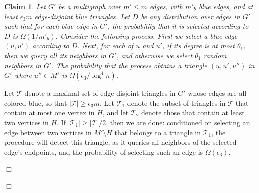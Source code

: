 \documentclass{article}
\newcommand{\eps}{\epsilon}
\newcommand{\calC}{{\mathcal{C}}}
\newcommand{\calT}{{\mathcal{T}}}
\newenvironment{proof}{\smallskip\noindent{\bf Proof:}}%
        {\hspace*{\fill}$\Box$\par}
\newtheorem{claim}[lemma]{Claim}
\newcommand{\commentt}[1]{ {}}
\begin{document}
\begin{proof}

\begin{claim}\label{clm:tri-G-prime}
Let $G'$ be a multigraph over $m' \leq m$ edges, with $m'_b$ blue edges, and 
at least $\eps_3 m$ edge-disjoint blue triangles. 
Let $D$ be any distribution over edges in $G'$ such that for each blue edge in $G'$, the probability that it is selected according to $D$ is %
$\Omega(1/m'_b)$.
Consider the following process.
First we select a blue edge $(u,u')$ according to $D$. 
Next, for each of $u$ and $u'$, if its degree %
is at most $\theta_1$, then we query all its neighbors in $G'$, and otherwise
we select $\theta_1$  random neighbors in $G'$.
 The probability that the process obtains a triangle $(u,u',u'')$ in $G'$ where $u''\in M'$ is 
$\Omega(\eps_3/\log^4 n)$.
\end{claim}

\begin{proof}
Let $\calT$ denote a maximal set of edge-disjoint triangles in $G'$ whose edges are all colored blue, so that $|\calT| \geq \eps_3 m$. Let $\calT_1$ denote the subset of triangles in $\calT$ that contain at most one vertex in $H$, and let $\calT_2$ denote those that contain at least two vertices in $H$. If $|\calT_1| \geq |\calT|/2$, then we are done:  conditioned on selecting an edge between two vertices in $M'\setminus H$ that belongs to a triangle in $\calT_1$, the procedure will detect this triangle, as it queries all neighbors of the selected edge's endpoints, and the probability of selecting such an edge is %
$\Omega(\eps_3)$.


\end{proof}
\end{proof}
\end{document}
